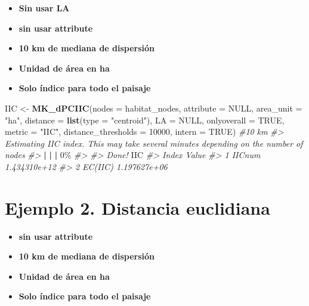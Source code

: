 \documentclass[
]{book}
\newenvironment{Shaded}{\begin{snugshade}}{\end{snugshade}}
\newcommand{\AttributeTok}[1]{\textcolor[rgb]{0.13,0.29,0.53}{#1}}
\newcommand{\CommentTok}[1]{\textcolor[rgb]{0.56,0.35,0.01}{\textit{#1}}}
\newcommand{\ConstantTok}[1]{\textcolor[rgb]{0.56,0.35,0.01}{#1}}
\newcommand{\DecValTok}[1]{\textcolor[rgb]{0.00,0.00,0.81}{#1}}
\newcommand{\ErrorTok}[1]{\textcolor[rgb]{0.64,0.00,0.00}{\textbf{#1}}}
\newcommand{\FunctionTok}[1]{\textcolor[rgb]{0.13,0.29,0.53}{\textbf{#1}}}
\newcommand{\NormalTok}[1]{#1}
\newcommand{\OtherTok}[1]{\textcolor[rgb]{0.56,0.35,0.01}{#1}}
\newcommand{\SpecialCharTok}[1]{\textcolor[rgb]{0.81,0.36,0.00}{\textbf{#1}}}
\newcommand{\StringTok}[1]{\textcolor[rgb]{0.31,0.60,0.02}{#1}}
\providecommand{\tightlist}{%
  \setlength{\itemsep}{0pt}\setlength{\parskip}{0pt}}
\begin{document}
\begin{itemize}
\tightlist
\item
  \textbf{Sin usar LA}
\item
  \textbf{sin usar attribute}
\item
  \textbf{10 km de mediana de dispersión}
\item
  \textbf{Unidad de área en ha}
\item
  \textbf{Solo índice para todo el paisaje}
\end{itemize}

\begin{Shaded}
\begin{Highlighting}[]
\NormalTok{IIC }\OtherTok{\textless{}{-}} \FunctionTok{MK\_dPCIIC}\NormalTok{(}\AttributeTok{nodes =}\NormalTok{ habitat\_nodes,}
                \AttributeTok{attribute =} \ConstantTok{NULL}\NormalTok{,}
                \AttributeTok{area\_unit =} \StringTok{"ha"}\NormalTok{,}
                \AttributeTok{distance =} \FunctionTok{list}\NormalTok{(}\AttributeTok{type =} \StringTok{"centroid"}\NormalTok{),}
                \AttributeTok{LA =} \ConstantTok{NULL}\NormalTok{,}
                \AttributeTok{onlyoverall =} \ConstantTok{TRUE}\NormalTok{,}
                \AttributeTok{metric =} \StringTok{"IIC"}\NormalTok{,}
                \AttributeTok{distance\_thresholds =} \DecValTok{10000}\NormalTok{,}
                \AttributeTok{intern =} \ConstantTok{TRUE}\NormalTok{) }\CommentTok{\#10 km}
\CommentTok{\#\textgreater{} Estimating IIC index. This may take several minutes depending on the number of nodes}
\CommentTok{\#\textgreater{} }
  \SpecialCharTok{|}                                                        
  \ErrorTok{|}                                                  \ErrorTok{|}   \DecValTok{0}\NormalTok{\%}
\CommentTok{\#\textgreater{} }
\CommentTok{\#\textgreater{} Done!}
\NormalTok{IIC}
\CommentTok{\#\textgreater{}     Index        Value}
\CommentTok{\#\textgreater{} 1  IICnum 1.434310e+12}
\CommentTok{\#\textgreater{} 2 EC(IIC) 1.197627e+06}
\end{Highlighting}
\end{Shaded}

\section{Ejemplo 2. Distancia euclidiana}\label{ejemplo-2.-distancia-euclidiana}

\begin{itemize}
\tightlist
\item
  \textbf{sin usar attribute}
\item
  \textbf{10 km de mediana de dispersión}
\item
  \textbf{Unidad de área en ha}
\item
  \textbf{Solo índice para todo el paisaje}
\end{itemize}
\end{document}
